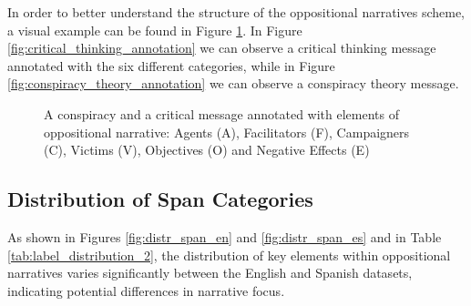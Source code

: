 \documentclass{Configuration_Files/PoliMi3i_thesis}
\begin{document}
In order to better understand the structure of the oppositional narratives scheme, a visual example can be found in Figure \ref{fig:critical_conspiracy_annotation}. 
In Figure \ref{fig:critical_thinking_annotation} we can observe a critical thinking message  annotated with the six different categories, while in Figure \ref{fig:conspiracy_theory_annotation} we can observe a conspiracy theory message.

\begin{figure}[h]
    \centering
    \vspace{0.5cm} 
    \vspace{0.5cm} 
    \caption{A conspiracy and a critical message annotated with elements of oppositional narrative: Agents (A), Facilitators (F), Campaigners (C), Victims (V), Objectives (O) and Negative Effects (E) \cite{korenvcic2024distinguishes}}
    \label{fig:critical_conspiracy_annotation}
\end{figure}
\FloatBarrier

\subsection{Distribution of Span Categories} \label{subsec:distribution_span_categories}
As shown in Figures \ref{fig:distr_span_en} and \ref{fig:distr_span_es} and in Table \ref{tab:label_distribution_2}, the distribution of key elements within oppositional narratives varies significantly between the English and Spanish datasets, indicating potential differences in narrative focus.
\end{document}
